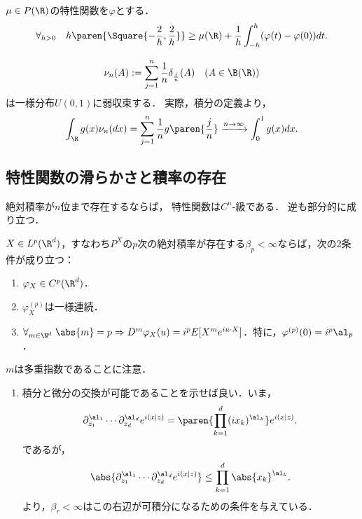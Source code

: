 \documentclass[uplatex,dvipdfmx]{jsreport}
\begin{document}
\begin{lemma}
    $\mu\in P(\R)$の特性関数を$\varphi$とする．
    \[\forall_{h>0}\quad h\paren{\Square{-\frac{2}{h},\frac{2}{h}}}\ge\mu(\R)+\frac{1}{h}\int^h_{-h}(\varphi(t)-\varphi(0))dt.\]
\end{lemma}

\begin{example}
    \[\nu_n(A):=\sum^n_{j=1}\frac{1}{n}\delta_{\frac{j}{n}}(A)\quad(A\in\B(\R))\]
    は一様分布$U(0,1)$に弱収束する．
    実際，積分の定義より，
    \[\int_\R g(x)\nu_n(dx)=\sum^n_{j=1}\frac{1}{n}g\paren{\frac{j}{n}}\xrightarrow{n\to\infty}\int^1_0g(x)dx.\]
\end{example}

\subsection{特性関数の滑らかさと積率の存在}

\begin{tcolorbox}[colframe=ForestGreen, colback=ForestGreen!10!white,breakable,colbacktitle=ForestGreen!40!white,coltitle=black,fonttitle=\bfseries\sffamily,
title=]
    絶対積率が$n$位まで存在するならば，
    特性関数は$C^n$-級である．
    逆も部分的に成り立つ．
\end{tcolorbox}

\begin{theorem}
    $X\in L^p(\R^d)$，すなわち$P^X$の$p$次の絶対積率が存在する$\beta_p<\infty$ならば，次の2条件が成り立つ：
    \begin{enumerate}
        \item $\varphi_X\in C^p(\R^d)$．
        \item $\varphi_X^{(p)}$は一様連続．
        \item $\forall_{m\in\N^d}\;\abs{m}=p\Rightarrow D^m\varphi_X(u)=i^pE[X^me^{iu\cdot X}]$．特に，$\varphi^{(p)}(0)=i^p\al_p$．
    \end{enumerate}
    $m$は多重指数であることに注意．
\end{theorem}
\begin{Proof}\mbox{}
    \begin{enumerate}
        \item 積分と微分の交換が可能であることを示せば良い．いま，
        \[\partial_{z_1}^{\al_1}\cdots\partial^{\al_d}_{z_d}e^{i(x|z)}=\paren{\prod^d_{k=1}(ix_k)^{\al_k}}e^{i(x|z)}.\]
        であるが，
        \[\abs{\partial_{z_1}^{\al_1}\cdots\partial^{\al_d}_{z_d}e^{i(x|z)}}\le\prod_{k=1}^d\abs{x_k}^{\al_k}.\]
        より，$\beta_r<\infty$はこの右辺が可積分になるための条件を与えている．
    \end{enumerate}
\end{Proof}
\end{document}
